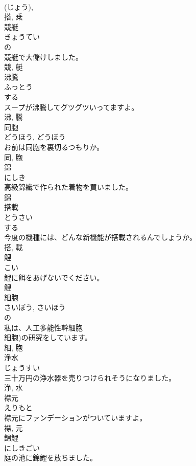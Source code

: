 \documentclass[8pt]{extreport}
\begin{document}
\begin{CJK}{UTF8}{min}
\\	(じょう), 
\\	搭, 乗	
\\	競艇	
\\	きょうてい	
\\	の 
\\	競艇で大儲けしました。	
\\	競, 艇	
\\	沸騰	
\\	ふっとう	
\\	する 
\\	スープが沸騰してグツグツいってますよ。	
\\	沸, 騰	
\\	同胞	
\\	どうほう, どうぼう	
\\	お前は同胞を裏切るつもりか。	
\\	同, 胞	
\\	錦	
\\	にしき	
\\	高級錦織で作られた着物を買いました。	
\\	錦	
\\	搭載	
\\	とうさい	
\\	する 
\\	今度の機種には、どんな新機能が搭載されるんでしょうか。	
\\	搭, 載	
\\	鯉	
\\	こい	
\\	鯉に餌をあげないでください。	
\\	鯉	
\\	細胞	
\\	さいぼう, さいほう	
\\	の 
\\	私は、人工多能性幹細胞
\\	細胞)の研究をしています。	
\\	細, 胞	
\\	浄水	
\\	じょうすい	
\\	三十万円の浄水器を売りつけられそうになりました。	
\\	浄, 水	
\\	襟元	
\\	えりもと	
\\	襟元にファンデーションがついていますよ。	
\\	襟, 元	
\\	錦鯉	
\\	にしきごい	
\\	庭の池に錦鯉を放ちました。	

\end{CJK}
\end{document}
